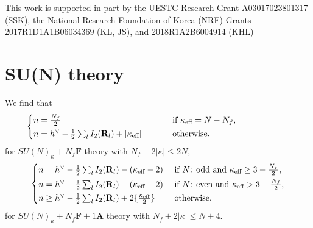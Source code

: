 \documentclass[letterpaper, 11pt]{article}
\def\k{\kappa}
\begin{document}
{\acknowledgments
This work is supported in part by the UESTC Research Grant A03017023801317 (SSK), the National Research Foundation of Korea (NRF) Grants 2017R1D1A1B06034369 (KL, JS), and 2018R1A2B6004914 (KHL)


\appendix
\section{SU(N) theory}
\label{sec:bound-su}
We find that 
\begin{align}
  \hspace{-2.2cm}
  \begin{dcases}
  n = \textstyle \frac{N_f}{2}
  & \hspace{0.8cm} \textstyle\text{ if }  \kappa_\text{eff} = N - N_f, \\
  n = \textstyle h^\vee - \frac{1}{2} \sum_{l}I_2(\mathbf{R}_l) + |\k_\text{eff}| 
  & \hspace{0.8cm}\textstyle\text{ otherwise}.
  \end{dcases}
\end{align}
for $SU(N)_\kappa + N_f\mathbf{F}$ theory  with $N_f + 2|\kappa| \leq 2N$, 
\begin{align}
  \begin{dcases}
    n  = \textstyle h^\vee - \frac{1}{2} \sum_{l}I_2(\mathbf{R}_l)  - (\k_\text{eff}-2) & \textstyle\text{ if $N$: odd and }  \kappa_\text{eff} \geq 3 - \frac{N_f}{2},\\
    n  = \textstyle h^\vee - \frac{1}{2} \sum_{l}I_2(\mathbf{R}_l)  - (\k_\text{eff}-2) & \textstyle\text{ if $N$: even and }  \kappa_\text{eff} > 3 - \frac{N_f}{2}  ,\\
    n  \geq 
     \textstyle h^\vee - \frac{1}{2} \sum_{l}I_2(\mathbf{R}_l) + 2\{\frac{\k_\text{eff}}{2}\}
     &\textstyle\text{ otherwise}.
  \end{dcases}
\end{align}
for $SU(N)_\kappa + N_f\mathbf{F} + 1\mathbf{A}$ theory with $N_f + 2|\kappa| \leq N+4$. 

}
\end{document}
